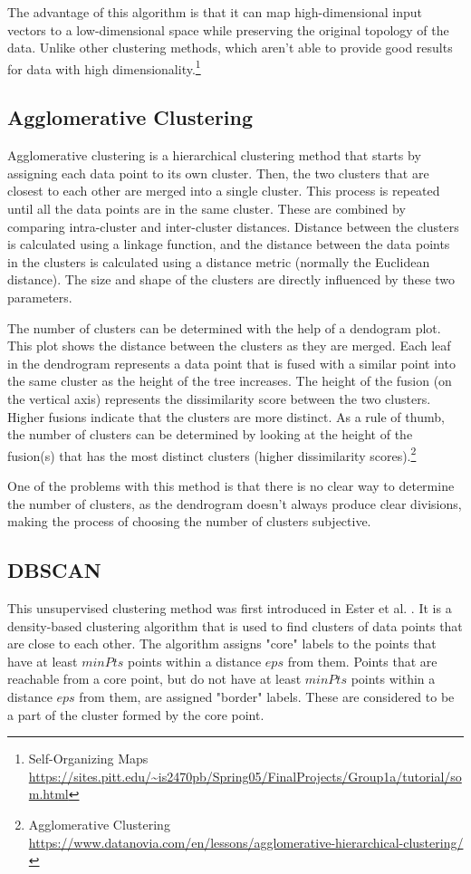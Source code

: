 The advantage of this algorithm is that it can map high-dimensional input vectors to a low-dimensional space while preserving the original topology of the data. Unlike other clustering methods, which aren't able to provide good results for data with high dimensionality.\footnote{Self-Organizing Maps \url{https://sites.pitt.edu/~is2470pb/Spring05/FinalProjects/Group1a/tutorial/som.html}}

\subsection{Agglomerative Clustering}\label{sec:aglomerative}
Agglomerative clustering is a hierarchical clustering method that starts by assigning each data point to its own cluster. Then, the two clusters that are closest to each other are merged into a single cluster. This process is repeated until all the data points are in the same cluster. These are combined by comparing intra-cluster and inter-cluster distances. Distance between the clusters is calculated using a linkage function, and the distance between the data points in the clusters is calculated using a distance metric (normally the Euclidean distance). The size and shape of the clusters are directly influenced by these two parameters.

The number of clusters can be determined with the help of a dendogram plot. This plot shows the distance between the clusters as they are merged. Each leaf in the dendrogram represents a data point that is fused with a similar point into the same cluster as the height of the tree increases. The height of the fusion (on the vertical axis) represents the dissimilarity score between the two clusters. Higher fusions indicate that the clusters are more distinct. As a rule of thumb, the number of clusters can be determined by looking at the height of the fusion(s) that has the most distinct clusters (higher dissimilarity scores).\footnote{Agglomerative Clustering \url{https://www.datanovia.com/en/lessons/agglomerative-hierarchical-clustering/}}

One of the problems with this method is that there is no clear way to determine the number of clusters, as the dendrogram doesn't always produce clear divisions, making the process of choosing the number of clusters subjective.

\subsection{DBSCAN}\label{sec:dbscan}
This unsupervised clustering method was first introduced in Ester et al. \cite{dbscan}. It is a density-based clustering algorithm that is used to find clusters of data points that are close to each other. The algorithm assigns "core" labels to the points that have at least $minPts$ points within a distance $eps$ from them. Points that are reachable from a core point, but do not have at least $minPts$ points within a distance $eps$ from them, are assigned "border" labels. These are considered to be a part of the cluster formed by the core point.

